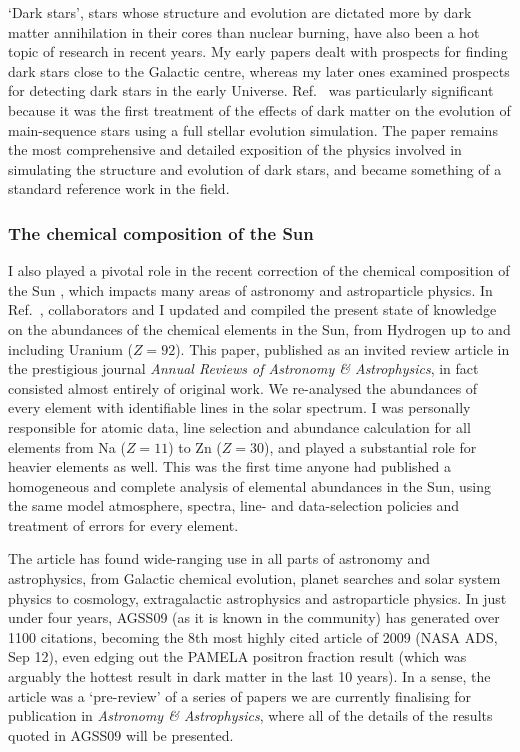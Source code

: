 \documentclass[a4paper,11pt]{article}
\begin{document}
`Dark stars', stars whose structure and evolution are dictated more by dark matter annihilation in their cores than nuclear burning, have also been a hot topic of research in recent years.  My early papers \cite{Scott09, Fairbairn08, Scott08a} dealt with prospects for finding dark stars close to the Galactic centre, whereas my later ones \cite{Scott11, Zackrisson10b, Zackrisson10a} examined prospects for detecting dark stars in the early Universe.  Ref.\ \cite{Scott09} was particularly significant because it was the first treatment of the effects of dark matter on the evolution of main-sequence stars using a full stellar evolution simulation.  The paper remains the most comprehensive and detailed exposition of the physics involved in simulating the structure and evolution of dark stars, and became something of a standard reference work in the field.

\subsubsection{The chemical composition of the Sun}
I also played a pivotal role in the recent correction of the chemical composition of the Sun \cite{ScottVII, Scott09Ni, AGSS}, which impacts many areas of astronomy and astroparticle physics.  In Ref.\ \cite{AGSS}, collaborators and I updated and compiled the present state of knowledge on the abundances of the chemical elements in the Sun, from Hydrogen up to and including Uranium ($Z=92$).  This paper, published as an invited review article in the prestigious journal \textit{Annual Reviews of Astronomy \& Astrophysics}, in fact consisted almost entirely of original work.  We re-analysed the abundances of every element with identifiable lines in the solar spectrum.  I was personally responsible for atomic data, line selection and abundance calculation for all elements from Na ($Z=11$) to Zn ($Z=30$), and played a substantial role for heavier elements as well.  This was the first time anyone had published a homogeneous and complete analysis of elemental abundances in the Sun, using the same model atmosphere, spectra, line- and data-selection policies and treatment of errors for every element.

The article has found wide-ranging use in all parts of astronomy and astrophysics, from Galactic chemical evolution, planet searches and solar system physics to cosmology, extragalactic astrophysics and astroparticle physics.  In just under four years, AGSS09 (as it is known in the community) has generated over 1100 citations, becoming the 8th most highly cited article of 2009 (NASA ADS, Sep 12), even edging out the PAMELA positron fraction result \cite{Pamelapositron} (which was arguably the hottest result in dark matter in the last 10 years).  In a sense, the article was a `pre-review' of a series of papers we are currently finalising for publication in \textit{Astronomy \& Astrophysics}, where all of the details of the results quoted in AGSS09 will be presented.
\end{document}
